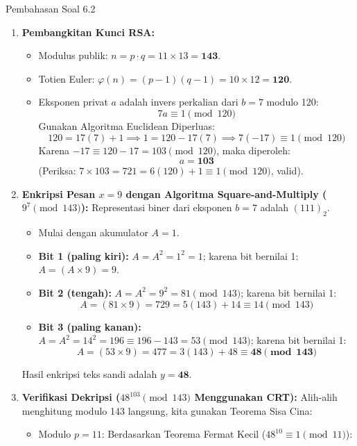 \documentclass[11pt,a4paper]{article}
\begin{document}
\begin{solusibox}{Pembahasan Soal 6.2}
\begin{enumerate}[leftmargin=*]
    \item \textbf{Pembangkitan Kunci RSA:}
    \begin{itemize}
        \item Modulus publik: $n = p \cdot q = 11 \times 13 = \mathbf{143}$.
        \item Totien Euler: $\varphi(n) = (p - 1)(q - 1) = 10 \times 12 = \mathbf{120}$.
        \item Eksponen privat $a$ adalah invers perkalian dari $b = 7$ modulo 120:
        \[
        7 a \equiv 1 \pmod{120}
        \]
        Gunakan Algoritma Euclidean Diperluas:
        \[
        120 = 17(7) + 1 \implies 1 = 120 - 17(7) \implies 7(-17) \equiv 1 \pmod{120}
        \]
        Karena $-17 \equiv 120 - 17 = 103 \pmod{120}$, maka diperoleh:
        \[
        a = \mathbf{103}
        \]
        (Periksa: $7 \times 103 = 721 = 6(120) + 1 \equiv 1 \pmod{120}$, valid).
    \end{itemize}
    \item \textbf{Enkripsi Pesan $x = 9$ dengan Algoritma Square-and-Multiply ($9^7 \pmod{143}$):}
    Representasi biner dari eksponen $b = 7$ adalah $(111)_2$.
    \begin{itemize}
        \item Mulai dengan akumulator $A = 1$.
        \item \textbf{Bit 1 (paling kiri):} $A = A^2 = 1^2 = 1$; karena bit bernilai 1: $A = (A \times 9) = 9$.
        \item \textbf{Bit 2 (tengah):} $A = A^2 = 9^2 = 81 \pmod{143}$; karena bit bernilai 1:
        \[
        A = (81 \times 9) = 729 = 5(143) + 14 \equiv 14 \pmod{143}
        \]
        \item \textbf{Bit 3 (paling kanan):} $A = A^2 = 14^2 = 196 \equiv 196 - 143 = 53 \pmod{143}$; karena bit bernilai 1:
        \[
        A = (53 \times 9) = 477 = 3(143) + 48 \equiv \mathbf{48 \pmod{143}}
        \]
    \end{itemize}
    Hasil enkripsi teks sandi adalah $y = \mathbf{48}$.
    \item \textbf{Verifikasi Dekripsi ($48^{103} \pmod{143}$ Menggunakan CRT):}
    Alih-alih menghitung modulo 143 langsung, kita gunakan Teorema Sisa Cina:
    \begin{itemize}
        \item Modulo $p = 11$: Berdasarkan Teorema Fermat Kecil ($48^{10} \equiv 1 \pmod{11}$):

\end{itemize}
\end{enumerate}
\end{solusibox}
\end{document}
